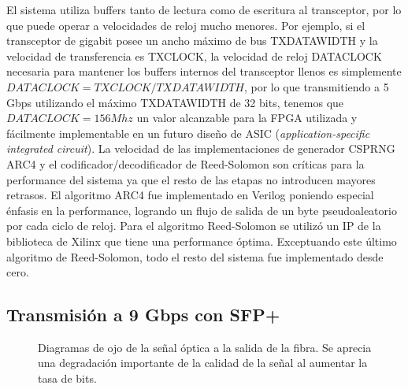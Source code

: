  

El sistema utiliza buffers tanto de lectura como de escritura al transceptor, por lo que puede operar a velocidades de reloj mucho menores. Por ejemplo, si el transceptor de gigabit posee un ancho máximo de bus TXDATAWIDTH y la velocidad de transferencia es TXCLOCK, la velocidad de reloj DATACLOCK necesaria para mantener los buffers internos del transceptor llenos es simplemente $DATACLOCK=TXCLOCK/TXDATAWIDTH$, por lo que transmitiendo a 5 Gbps utilizando el máximo TXDATAWIDTH de 32 bits, tenemos que $DATACLOCK=156Mhz$ un valor alcanzable para la FPGA utilizada y fácilmente implementable en un futuro diseño de ASIC (\textit{application-specific integrated circuit}).
La velocidad de las implementaciones de generador CSPRNG ARC4 y el codificador/decodificador de Reed-Solomon son críticas para la performance del sistema ya que el resto de las etapas no introducen mayores retrasos. El algoritmo ARC4 fue implementado en Verilog poniendo especial énfasis en la performance, logrando un flujo de salida de un byte pseudoaleatorio por cada ciclo de reloj. Para el algoritmo Reed-Solomon se utilizó un IP de la biblioteca de Xilinx que tiene una performance óptima. Exceptuando este último algoritmo de Reed-Solomon, todo el resto del sistema fue implementado desde cero.


\subsection{Transmisión a 9 Gbps con SFP+}

\begin{figure}[!t]
   \centering
   \qquad
   \qquad
  \caption {Diagramas de ojo de la señal óptica a la salida de la fibra. Se aprecia una degradación importante de la calidad de la señal al aumentar la tasa de bits.}
  \label{fig:ImgOjo}
\end{figure}


